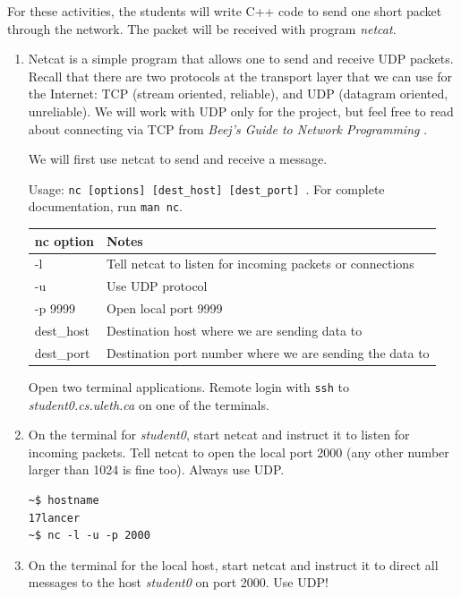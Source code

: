 \documentclass[12pt]{book}
\begin{document}
For these activities, the students will write C++ code to send one short packet through the network. The packet will be received with program \emph{netcat}. 

\begin{enumerate}[label=Activity \arabic*:]
\item Netcat is a simple program that allows one to send and receive UDP packets. Recall that there are two protocols at the transport layer that we can use for the Internet: TCP (stream oriented, reliable), and UDP (datagram oriented, unreliable). We will work with UDP only for the project, but feel free to read about connecting via TCP from \emph{Beej's Guide to Network Programming} \cite{hall2009beej}.

  We will first use netcat to send and receive a message.

  Usage: \verb$nc [options] [dest_host] [dest_port] $. For complete documentation, run \verb$man nc$.

  \begin{tabular}{l p{11cm}}
    \toprule
    nc option & Notes \\
    \midrule
    -l & Tell netcat to listen for incoming packets or connections \\
    -u & Use UDP protocol \\
    -p 9999 & Open local port 9999 \\
    dest\_host & Destination host where we are sending data to \\
    dest\_port & Destination port number where we are sending the data to \\
    \bottomrule
  \end{tabular}

  Open two terminal applications. Remote login with \verb$ssh$ to \emph{student0.cs.uleth.ca} on one of the terminals.

\item On the terminal for \emph{student0}, start netcat and instruct it to listen for incoming packets. Tell netcat to open the local port 2000 (any other number larger than 1024 is fine too). Always use UDP.

  \begin{lstlisting}
~$ hostname
17lancer
~$ nc -l -u -p 2000   
  \end{lstlisting}

\item On the terminal for the local host, start netcat and instruct it to direct all messages to the host \emph{student0} on port 2000. Use UDP!


\end{enumerate}
\end{document}
